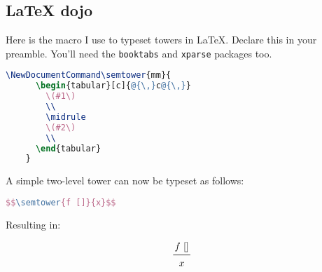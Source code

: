 \documentclass[nols,twoside,nofonts,nobib,nohyper]{tufte-handout}
\begin{document}
\begin{appendices}
  \section{{\LaTeX} dojo}

  Here is the macro I use to typeset towers in \LaTeX. Declare this in your
  preamble. You'll need the \texttt{booktabs} and \texttt{xparse} packages too.

  \begin{lstlisting}[language=TeX]
    \NewDocumentCommand\semtower{mm}{
      \begin{tabular}[c]{@{\,}c@{\,}}
        \(#1\)
        \\
        \midrule
        \(#2\)
        \\
      \end{tabular}
    }
  \end{lstlisting}

 A simple two-level tower can now be typeset as follows:

    \begin{lstlisting}[language=TeX]
      $$\semtower{f []}{x}$$
  \end{lstlisting}

  Resulting in:

  $$\semtower{f []}{x}$$

  \end{appendices}
\end{document}
